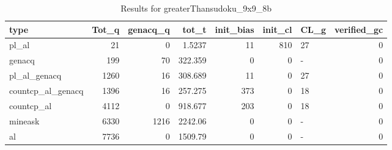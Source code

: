 \begin{table}[ht]
\caption{Results for greaterThansudoku_9x9_8b}
\begin{tabular}{lrrrrrlr}
\hline
 type              &   Tot\_q &   genacq\_q &     tot\_t &   init\_bias &   init\_cl & CL\_g   &   verified\_gc \\
\hline
 pl\_al             &      21 &          0 &    1.5237 &          11 &       810 & 27     &             0 \\
 genacq            &     199 &         70 &  322.359  &           0 &         0 & -      &             0 \\
 pl\_al\_genacq      &    1260 &         16 &  308.689  &          11 &         0 & 27     &             0 \\
 countcp\_al\_genacq &    1396 &         16 &  257.275  &         373 &         0 & 18     &             0 \\
 countcp\_al        &    4112 &          0 &  918.677  &         203 &         0 & 18     &             0 \\
 mineask           &    6330 &       1216 & 2242.06   &           0 &         0 & -      &             0 \\
 al                &    7736 &          0 & 1509.79   &           0 &         0 & -      &             0 \\
\hline
\end{tabular}
\end{table}